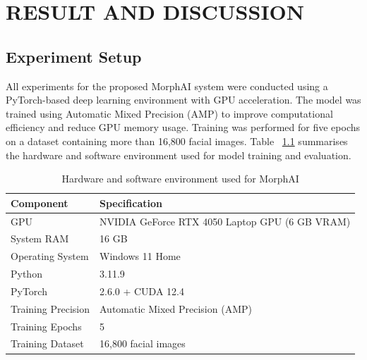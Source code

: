 \chapter{RESULT AND DISCUSSION}


\section{Experiment Setup}

All experiments for the proposed MorphAI system were conducted using a
PyTorch-based deep learning environment with GPU acceleration. The model
was trained using Automatic Mixed Precision (AMP) to improve computational
efficiency and reduce GPU memory usage. Training was performed for five
epochs on a dataset containing more than 16,800 facial images. Table
~\ref{tab:hardware} summarises the hardware and software environment used
for model training and evaluation.

\begin{table}[h!]
\centering
\renewcommand{\arraystretch}{1.1}
\begin{tabular}{|l|l|}
\hline
\textbf{Component} & \textbf{Specification} \\ \hline
GPU & NVIDIA GeForce RTX 4050 Laptop GPU (6 GB VRAM) \\ \hline
System RAM & 16 GB \\ \hline
Operating System & Windows 11 Home \\ \hline
Python & 3.11.9 \\ \hline
PyTorch & 2.6.0 + CUDA 12.4 \\ \hline
Training Precision & Automatic Mixed Precision (AMP) \\ \hline
Training Epochs & 5 \\ \hline
Training Dataset & 16,800 facial images \\ \hline
\end{tabular}
\vspace{2pt}
\caption{Hardware and software environment used for MorphAI}
\label{tab:hardware}
\end{table}

